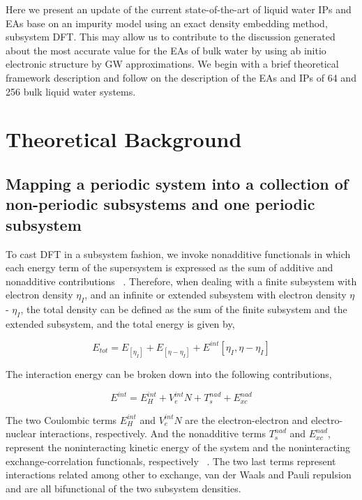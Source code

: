 \documentclass[12pt,a4paper]{article}
\begin{document}
Here we present an update of the current state-of-the-art of liquid water IPs and EAs base on an impurity model using an exact density
embedding method, subsystem DFT. This may allow us to contribute to the discussion generated about the most accurate value for the EAs of bulk water
by using ab initio electronic structure \cite{ambrosio2017electronic, gaiduk2018electron} by GW approximations. We begin with a brief theoretical
framework description and follow on the description of the EAs and IPs of 64 and 256 bulk liquid water systems.


\section{Theoretical Background}

\subsection{Mapping a periodic system into a collection of non-periodic subsystems and one periodic subsystem}

To cast DFT in a subsystem fashion, we invoke nonadditive functionals in which each energy term of the supersystem is expressed as the sum of
additive and nonadditive contributions ~\cite{martyna1999reciprocal}. Therefore, when dealing with a finite subsystem with electron density
$\eta_I$, and an infinite or extended subsystem with electron density $\eta$ - $\eta_I$, the total density can be defined as the sum of the
finite subsystem and the extended subsystem, and the total energy is given by,

\begin{equation}
	E_{tot} = {E_[{\eta}_I]} + {E_[{\eta} - {\eta}_I]} + {E^{int}[{\eta}_I, {\eta} - {\eta}_I] } 
\end{equation}

The interaction energy can be broken down into the following contributions,

\begin{equation}
	E^{int} = E^{int}_H + V^{int}_eN + T^{nad}_s + E^{nad}_{xc} 
\end{equation}

The two Coulombic terms $E^{int}_H$ and $V^{int}_eN$ are the electron-electron and electro-nuclear interactions, respectively. And the
nonadditive terms $T^{nad}_s$ and $E^{nad}_{xc}$, represent the noninteracting kinetic energy of the system and the noninteracting
exchange-correlation functionals, respectively ~\cite{krishtal2015subsystem}. The two last terms represent interactions related among other to exchange, van der Waals and Pauli repulsion and are all bifunctional of the two subsystem densities.
\end{document}
